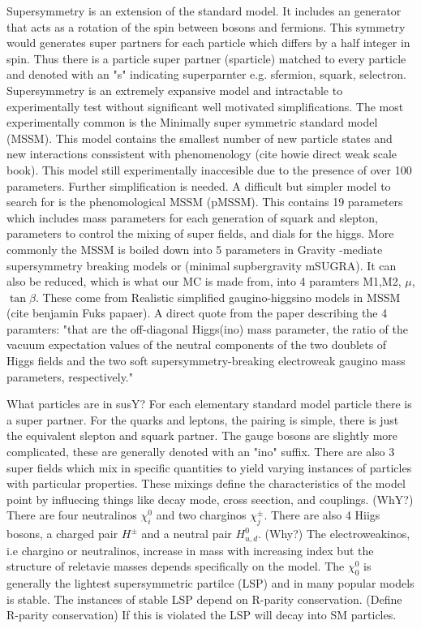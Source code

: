 Supersymmetry is an extension of the standard model. It includes an generator that acts as a rotation of the spin between bosons and fermions. This symmetry would generates super partners for each particle which differs by a half integer in spin. Thus there is a particle super partner (sparticle) matched to every particle and denoted with an "s" indicating superparnter e.g. sfermion, squark, selectron. Supersymmetry is an extremely expansive model and intractable to experimentally test without significant well motivated simplifications. The most experimentally common is the Minimally super symmetric standard model (MSSM). This model contains the smallest number of new particle states and new interactions conssistent with phenomenology (cite howie direct weak scale book). This model still experimentally inaccesible due to the presence of over 100 parameters. Further simplification is needed. A difficult but simpler model to search for is the phenomological MSSM (pMSSM). This contains 19 parameters which includes mass parameters for each generation of squark and slepton, parameters to control the mixing of super fields, and dials for the higgs.  More commonly the MSSM is boiled down into 5 parameters in Gravity -mediate supersymmetry breaking models or (minimal supbergravity mSUGRA). It can also be reduced, which is what our MC is made from, into 4 paramters M1,M2, $\mu$, $\tan\beta$. These come from Realistic simplified gaugino-higgsino models in MSSM (cite benjamin Fuks papaer). A direct quote from the paper describing the 4 paramters: "that are the off-diagonal Higgs(ino) mass parameter, the ratio of the vacuum expectation values of the neutral components of the two doublets of Higgs fields and the two soft
supersymmetry-breaking electroweak gaugino mass parameters, respectively."

What particles are in susY?
For each elementary standard model particle there is a super partner. For the quarks and leptons, the pairing is simple, there is just the equivalent slepton and squark partner. The gauge bosons are slightly more complicated, these are generally denoted with an "ino" suffix. There are also 3 super fields which mix in specific quantities to yield varying instances of particles with particular properties. These mixings define the characteristics of the model point by influecing things like decay mode, cross seection, and couplings.  (WhY?) There are four neutralinos $\chi^0_i$ and two charginos $\chi^\pm_j$. There are also 4 Hiigs bosons, a charged pair $H^\pm$ and a neutral pair $H^0_{u,d}$. (Why?)  The electroweakinos, i.e chargino or neutralinos, increase in mass with increasing index but the structure of reletavie masses depends specifically on the model. The $\chi^0_0$ is generally the lightest supersymmetric partilce (LSP) and in many popular models is stable. The instances of stable LSP depend on R-parity conservation. (Define R-parity conservation) If this is violated the LSP will decay into SM particles.



